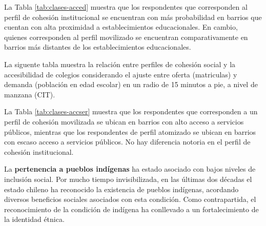 \documentclass[
  12pt,
]{book}
\begin{document}
La Tabla \ref{tab:clases-acced} muestra que los respondentes que corresponden al perfil de cohesión institucional se encuentran con más probabilidad en barrios que cuentan con alta proximidad a establecimientos educacionales. En cambio, quienes corresponden al perfil movilizado se encuentran comparativamente en barrios más distantes de los establecimientos educacionales.

La siguente tabla muestra la relación entre perfiles de cohesión social y la accesibilidad de colegios considerando el ajuste entre oferta (matriculas) y demanda (población en edad escolar) en un radio de 15 minutos a pie, a nivel de manzana (CIT).

\begin{table}

\caption{\label{tab:clases-accser}Efecto del acceso a servicios y equipamientos publicos sobre las clases de cohesion social}
\centering
{}
\end{table}

La Tabla \ref{tab:clases-accser} muestra que los respondentes que corresponden a un perfil de cohesión movilizada se ubican en barrios con alto acceso a servicios públicos, mientras que los respondentes de perfil atomizado se ubican en barrios con escaso acceso a servicios públicos. No hay diferencia notoria en el perfil de cohesión institucional.

La \textbf{pertenencia a pueblos indígenas} ha estado asociado con bajos niveles de inclusión social. Por mucho tiempo invisibilizada, en las últimas dos décadas el estado chileno ha reconocido la existencia de pueblos indígenas, acordando diversos beneficios sociales asociados con esta condición. Como contrapartida, el reconocimiento de la condición de indígena ha conllevado a un fortalecimiento de la identidad étnica.
\end{document}
